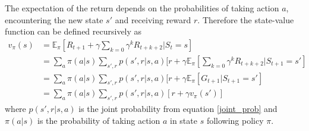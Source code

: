 \documentclass[11pt]{article}
\begin{document}
The expectation of the return depends on the probabilities of taking action $a$,
encountering the new state $s'$ and receiving reward $r$.
Therefore the state-value function can be defined recursively as
\begin{equation}
    \begin{aligned}
        v_\pi(s) & = \mathds{E}_\pi[R_{t+1} + \gamma \sum\limits_{k=0} \gamma^k R_{t+k+2} | S_t = s]\\
        & = \sum\limits_{a} \pi(a|s) \sum\limits_{s', r} p(s', r | s, a) [r + \gamma \mathds{E}_\pi[\sum\limits_{k=0} \gamma^k R_{t+k+2} | S_{t+1} = s']\\
        & =  \sum\limits_{a} \pi(a|s) \sum\limits_{s', r} p(s', r | s, a) [r + \gamma \mathds{E}_\pi[G_{t+1} | S_{t+1} = s']\\
        & =   \sum\limits_{a} \pi(a|s) \sum\limits_{s', r} p(s', r | s, a) [r + \gamma v_\pi(s')]
    \end{aligned}
\end{equation}
where $p(s', r | s, a)$ is the joint probability from equation \ref{joint_prob} and $\pi(a|s)$ is the
probability of taking action $a$ in state $s$ following policy $\pi$.

%
%
\end{document}
